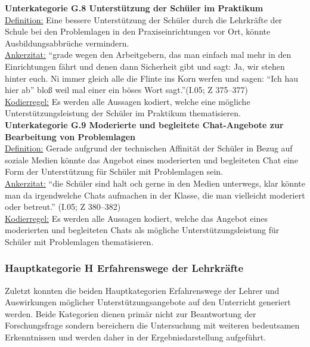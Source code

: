 \noindent
\textbf{Unterkategorie G.8 Unterstützung der Schüler im Praktikum}\\
\underline{Definition:} Eine bessere Unterstützung der Schüler durch die Lehrkräfte der Schule bei den Problemlagen in den Praxiseinrichtungen vor Ort, könnte Ausbildungsabbrüche vermindern.\\
\underline{Ankerzitat:} "`grade wegen den Arbeitgebern, das man einfach mal mehr in den Einrichtungen fährt und denen dann Sicherheit gibt und sagt: Ja, wir stehen hinter euch. Ni immer gleich alle die Flinte ins Korn werfen und sagen: "`Ich hau hier ab"' bloß weil mal einer ein böses Wort sagt."'(I.05; Z 375--377)\\
\underline{Kodierregel:} Es werden alle Aussagen kodiert, welche eine mögliche Unterstützungsleistung der Schüler im Praktikum thematisieren.\\

\noindent
\textbf{Unterkategorie G.9 Moderierte und begleitete Chat-Angebote zur Bearbeitung von Problemlagen}\\
\underline{Definition:} Gerade aufgrund der technischen Affinität der Schüler in Bezug auf soziale Medien könnte das Angebot eines moderierten und begleiteten Chat eine Form der Unterstützung für Schüler mit Problemlagen sein.\\
\underline{Ankerzitat:} "`die Schüler sind halt och gerne in den Medien unterwegs, klar könnte man da irgendwelche Chats aufmachen in der Klasse, die man vielleicht moderiert oder betreut."' (I.05; Z 380--382)\\
\underline{Kodierregel:} Es werden alle Aussagen kodiert, welche das Angebot eines moderierten und begleiteten Chats als mögliche Unterstützungsleistung für Schüler mit Problemlagen thematisieren.

\subsubsection{Hauptkategorie H Erfahrenswege der Lehrkräfte}
\label{sec:HauptkategorieHErfahrenswegeDerLehrkräfte}

Zuletzt konnten die beiden Hauptkategorien Erfahrenswege der Lehrer und Auswirkungen möglicher Unterstützungsangebote auf den Unterricht generiert werden. Beide Kategorien dienen primär nicht zur Beantwortung der Forschungsfrage sondern bereichern die Untersuchung mit weiteren bedeutsamen Erkenntnissen und werden daher in der Ergebnisdarstellung aufgeführt.\\

